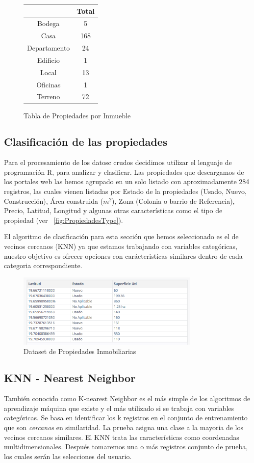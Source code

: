 \begin{figure}[h]
\centering
\begin{tabular}{cc}
  \hline
 & Total \\ 
  \hline
Bodega &   5 \\ 
  Casa & 168 \\ 
  Departamento &  24 \\ 
  Edificio &   1 \\ 
  Local &  13 \\ 
  Oficinas &   1 \\ 
  Terreno &  72 \\ 
   \hline
\end{tabular}
\caption{Tabla de Propiedades por Inmueble}
\label{fig:PropiedadesList}
\end{figure}

\subsection{Clasificación de las propiedades}
Para el procesamiento de los datosc crudos decidimos utilizar el lenguaje de programación R, para analizar y clasificar. Las propiedades que descargamos de los portales web las hemos agrupado en un solo listado con aproximadamente 284 registros, las cuales  vienen listadas por Estado de la propiedades (Usado, Nuevo, Construcción), Área construida ($m^2$), Zona (Colonia o barrio de Referencia), Precio, Latitud, Longitud y algunas otras características como el tipo de propiedad (ver ~\ref{fig:PropiedadesType}). 


El algoritmo de clasificación para esta sección que hemos seleccionado es el de vecinos cercanos (KNN) ya que estamos trabajando con variables categóricas, nuestro objetivo es ofrecer opciones con carácteristicas similares dentro de cada categoria correspondiente.
\begin{figure}[htbp]
\centering
\includegraphics[width=0.8\textwidth]{Dataset.png}
\caption{Dataset de Propiedades Inmobiliarias}
\end{figure}


\subsection{KNN - Nearest Neighbor}
También conocido como K-nearest Neighbor es el más simple de los algoritmos de aprendizaje máquina que existe y el más utilizado si se trabaja con variables categóricas. Se basa en identificar los k  registros en el conjunto de entrenamiento que son \emph{cercanos} en similaridad. La prueba asigna una clase a la mayoria de los vecinos cercanos similares. El KNN trata las características como coordenadas multidimensionales. Después tomaremos una o más registros conjunto de prueba, los cuales serán las selecciones del usuario. 

